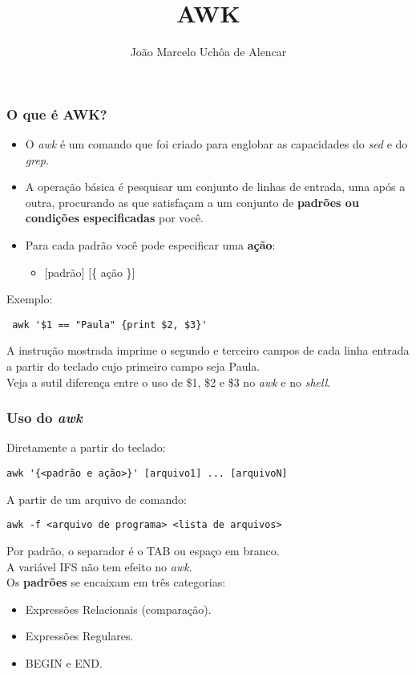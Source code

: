 \documentclass{beamer}
\title{AWK}
\author[João Marcelo Uchôa de Alencar]{João Marcelo Uchôa de Alencar}
\institute{Universidade Federal do Ceará - Quixadá}
\begin{document}
   \begin{frame}
      \titlepage
   \end{frame}

   \begin{frame}[fragile]
      \frametitle{O que é AWK?}
      \begin{itemize}
         \item O \textit{awk} é um comando que foi criado para englobar as capacidades do \textit{sed} e do \textit{grep}. 
         \item A operação básica é pesquisar um conjunto de linhas de entrada, uma após a outra, procurando as que satisfaçam a um conjunto de \textbf{padrões ou condições especificadas} por você. 
         \item Para cada padrão você pode especificar uma \textbf{ação}:
         \begin{itemize}
            \item $[$padrão$]$ $[$\{ ação \}$]$
         \end{itemize}   
      \end{itemize}	 
      \begin{block}{Exemplo:}
      \begin{verbatim}
 awk '$1 == "Paula" {print $2, $3}' 
      \end{verbatim}
      \end{block}
      A instrução mostrada imprime o segundo e terceiro campos de cada linha entrada a partir do teclado cujo primeiro campo seja Paula. \\
      Veja a sutil diferença entre o uso de \$1, \$2 e \$3 no \textit{awk} e no \textit{shell}. \\
\end{frame}

   \begin{frame}[fragile]
      \frametitle{Uso do \textit{awk}}
      \begin{block}{Diretamente a partir do teclado:}
      \begin{verbatim}
awk '{<padrão e ação>}' [arquivo1] ... [arquivoN] 
      \end{verbatim}
      \end{block}
      \begin{block}{A partir de um arquivo de comando:}
      \begin{verbatim}
awk -f <arquivo de programa> <lista de arquivos> 
      \end{verbatim}
      \end{block}
      Por padrão, o separador é o TAB ou espaço em branco. \\
      A variável IFS não tem efeito no \textit{awk}. \\
      Os \textbf{padrões} se encaixam em três categorias:
      \begin{itemize}
         \item Expressões Relacionais (comparação).
	      \item Expressões Regulares.
	      \item BEGIN e END.
      \end{itemize}
\end{frame}
\end{document}
